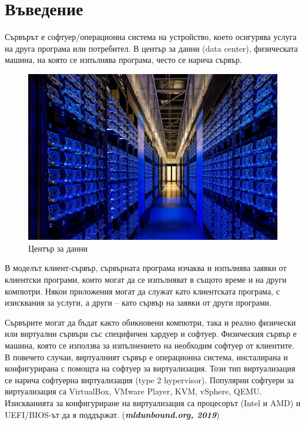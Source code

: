 


\chapter*{Въведение}\label{Introduction}

\setcounter{page}{1}

Сървърът е софтуер/операционна система на устройство, което осигурява услуга на друга програма или потребител. В център за данни (data center), физическата машина, на която се изпълнява програма, често се нарича сървър.

\begin{figure}[h]
	\centering
	\includegraphics[width=0.8\linewidth]{images/1-1-1Център за данни.png} %
	\caption{Център за данни}
	\label{fig:Център за данни}
\end{figure}


В моделът клиент-сървър, сървърната програма изчаква и изпълнява заявки от клиентски програми, които могат да се изпълняват в същото време и на други компютри. Някои приложения могат да служат като клиентската програма, с изисквания за услуги, а други – като сървър на заявки от други програми.

Сървърите могат да бъдат както обикновени компютри, така и реално физически или виртуални сървъри със специфичен хардуер и софтуер. Физическия сървър е машина, която се използва за изпълнението на необходим софтуер от клиентите. В повечето случаи, виртуалният сървър е операционна система, инсталирана и конфигурирана с помощта на софтуер за виртуализация. Този тип виртуализация се нарича софтуерна виртуализация (type 2 hypervisor). Популярни софтуери за виртуализация са VirtualBox, VMware Player, KVM, vSphere, QEMU. Изискванията за конфигуриране на виртуализация са процесорът (Intel и AMD) и UEFI/BIOS-ът да я поддържат. (\textit{\textbf{mldunbound.org, 2019}})

